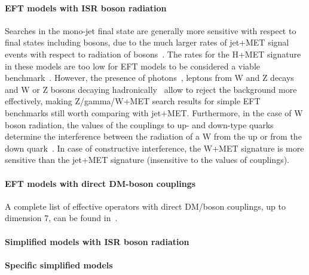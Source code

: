 \paragraph{EFT models with ISR boson radiation}

Searches in the mono-jet final state are generally more sensitive with respect to final
states including bosons, due to the much larger rates of jet+MET signal events with 
respect to radiation of bosons~\cite{Zhou:2013fla}.
The rates for the H+MET signature in these models are too low for EFT models 
to be considered a viable benchmark~\cite{Carpenter:2013xra}.
However, the presence of photons~\cite{Khachatryan:2014rwa, Aad:2014vka}, 
leptons from W and Z decays~\cite{Khachatryan:2014tva, Aad:2014vka, ATLAS:2014wra} 
and W or Z bosons decaying hadronically~\cite{Aad:2013oja}
allow to reject the background more effectively, making Z/gamma/W+MET search results for 
simple EFT benchmarks still worth comparing with jet+MET.
Furthermore, in the case of W boson radiation, the values of the 
couplings to up- and down-type quarks determine the interference between
the radiation of a W from the up or from the down quark~\cite{Bai:2012xg}. 
In case of constructive interference, the W+MET signature is more sensitive
than the jet+MET signature (insensitive to the values of couplings). 

\paragraph{EFT models with direct DM-boson couplings}

A complete list of effective operators with direct DM/boson couplings, 
up to dimension 7, can be found in~\cite{Cotta:2012nj}.

\paragraph{Simplified models with ISR boson radiation}

\paragraph{Specific simplified models}
